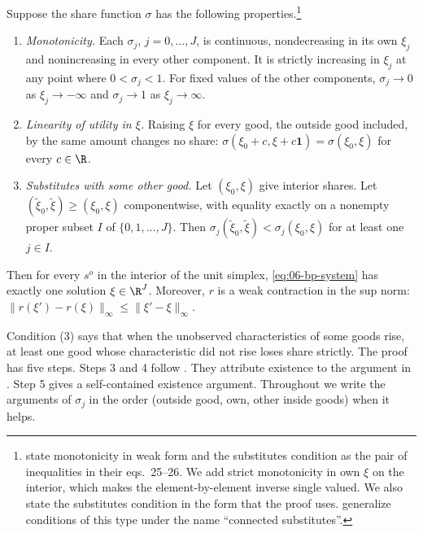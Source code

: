 \begin{theorem}\label{thm:06-bp-inverse}
Suppose the share function $\sigma$ has the following properties.\footnote{\citet{BerryPakes2007} state monotonicity in
weak form and the substitutes condition as the pair of inequalities in their eqs.~25--26. We add strict monotonicity in
own $\xi$ on the interior, which makes the element-by-element inverse single valued. We also state the substitutes
condition in the form that the proof uses. \citet{BerryGandhiHaile2013} generalize conditions of this type under the
name ``connected substitutes''.}
\begin{enumerate}[label=(\arabic*)]
\item \emph{Monotonicity.} Each $\sigma_j$, $j = 0, \dots, J$, is continuous, nondecreasing in its own $\xi_j$ and
nonincreasing in every other component. It is strictly increasing in $\xi_j$ at any point where $0 < \sigma_j < 1$. For
fixed values of the other components, $\sigma_j \to 0$ as $\xi_j \to -\infty$ and $\sigma_j \to 1$ as $\xi_j \to \infty$.
\item \emph{Linearity of utility in $\xi$.} Raising $\xi$ for every good, the outside good included, by the same amount
changes no share: $\sigma(\xi_0 + c, \xi + c\mathbf{1}) = \sigma(\xi_0, \xi)$ for every $c \in \R$.
\item \emph{Substitutes with some other good.} Let $(\xi_0, \xi)$ give interior shares. Let $(\tilde\xi_0, \tilde\xi) \ge
(\xi_0, \xi)$ componentwise, with equality exactly on a nonempty proper subset $I$ of $\{0, 1, \dots, J\}$. Then
$\sigma_j(\tilde\xi_0, \tilde\xi) < \sigma_j(\xi_0, \xi)$ for at least one $j \in I$.
\end{enumerate}
Then for every $s^o$ in the interior of the unit simplex, \eqref{eq:06-bp-system} has exactly one solution $\xi \in \R^J$.
Moreover, $r$ is a weak contraction in the sup norm: $\lVert r(\xi') - r(\xi) \rVert_\infty \le \lVert \xi' - \xi
\rVert_\infty$.
\end{theorem}

Condition (3) says that when the unobserved characteristics of some goods rise, at least one good whose characteristic
did not rise loses share strictly. The proof has five steps. Steps 3 and 4 follow \citet[eqs.~27--31]{BerryPakes2007}.
They attribute existence to the argument in \citet{Berry1994}. Step 5 gives a self-contained existence argument.
Throughout we write the arguments of $\sigma_j$ in the order (outside good, own, other inside goods) when it helps.


